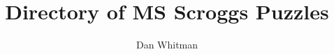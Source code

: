 \documentclass{article}
\begin{document}
\title{Directory of MS Scroggs Puzzles}
\author{Dan Whitman}
\date{}

\maketitle


\end{document}
